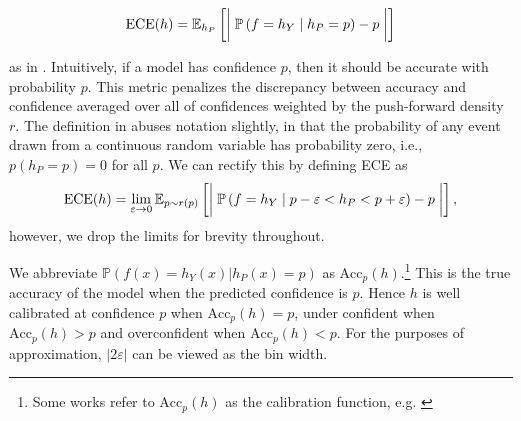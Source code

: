 \documentclass[10pt]{article} %
\theoremstyle{definition}
\newcommand{\Acc}{\mathrm{Acc}_p(h)}
\begin{document}
\begin{equation}
    \text{ECE} (h) = \mathbb{E}_{h_P}\left[\biggm|\mathbb{P}\left(f=h_Y\mid h_P = p\right) - p\biggm|\right] \label{eq:ECE}
\end{equation}   

as in \cite{guo2017calibration}. Intuitively, if a model has confidence $p$, then it should be accurate with probability $p$. This metric penalizes the discrepancy between accuracy and confidence averaged over all of confidences weighted by the push-forward density $r$. The definition in \cite{guo2017calibration} abuses notation slightly, in that the probability of any event drawn from a continuous random variable has probability zero, i.e., $p(h_P = p) = 0$ for all $p$. We can rectify this by defining ECE as 
\begin{equation}
    \text{ECE} (h) = \lim_{\varepsilon \to 0}\mathbb{E}_{p \sim r(p)}\left[\biggm|\mathbb{P}\left(f=h_Y \mid p - \varepsilon < h_P < p + \varepsilon\right) - p\biggm|\right], \label{eq:well_def}
\end{equation}
however, we drop the limits for brevity throughout. 

We abbreviate $\mathbb{P}(f(x)=h_Y(x)| h_P(x) = p)$ as $\Acc$.\footnote{Some works refer to $\Acc$ as the calibration function, e.g. \cite{vaicenavicius2019evaluating}}  This is the true accuracy of the model when the predicted confidence is $p$.  Hence $h$ is well calibrated at confidence $p$ when $\Acc = p$, under confident when $\Acc > p$ and overconfident when $\Acc < p$.  For the purposes of approximation, $|2 \varepsilon |$ can be viewed as the bin width. 
\end{document}
